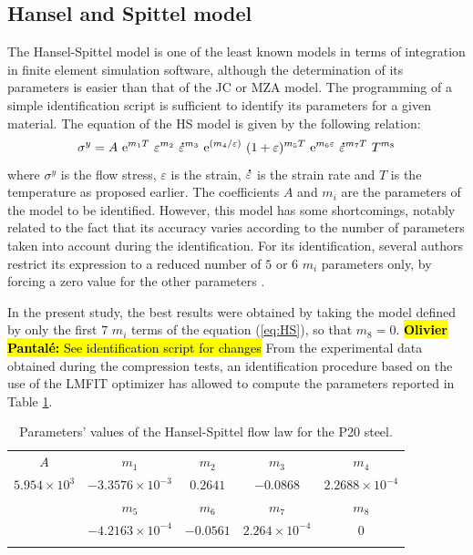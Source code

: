 \documentclass[twoside,english,1p,final,sort&compress]{elsarticle}
\theoremstyle{plain}
\newcommand{\e}[1]{{\rm e}^{#1}}
\newcommand{\mdot}[1]{\accentset{\mbox{\bfseries .}}{#1}}
\DeclareRobustCommand{\OP}[1]{ {\begingroup\sethlcolor{VWyellow}\textcolor{red}{\hl{\textbf{Olivier Pantal\'e:} #1}}\endgroup} }
\begin{document}
\subsection{Hansel and Spittel model\label{sec:HSmodel}}

The Hansel-Spittel model \cite{Hensel-1978} is one of the least known models in terms of integration in finite element simulation software, although the determination of its parameters is easier than that of the JC or MZA model.
The programming of a simple identification script is sufficient to identify its parameters for a given material.
The equation of the HS model is given by the following relation:
\begin{equation}
\sigma^y = A~\e{m_1T}~\varepsilon^{m_2}~\mdot\varepsilon^{m_3}~\e{({m_4}/{\varepsilon})}~(1+\varepsilon)^{m_5T}~\e{m_6\varepsilon}~\mdot\varepsilon^{m_7T}~T^{m_8} \label{eq:HS}
\end{equation}
where $\sigma^y$ is the flow stress, $\varepsilon$ is the strain, $\mdot\varepsilon$ is the strain rate and $T$ is the temperature as proposed earlier.
The coefficients $A$ and $m_i$ are the parameters of the model to be identified.
However, this model has some shortcomings, notably related to the fact that its accuracy varies according to the number of parameters taken into account during the identification.
For its identification, several authors restrict its expression to a reduced number of $5$ or $6$ $m_i$ parameters only, by forcing a zero value for the other parameters \cite{Chadha-2018, Rudnytskyj-2020, Mehtedi-2015}.

In the present study, the best results were obtained by taking the model defined by only the first $7$ $m_i$ terms of the equation (\ref{eq:HS}), so that $m_8=0$.\OP{See identification script for changes}
From the experimental data obtained during the compression tests, an identification procedure based on the use of the LMFIT optimizer \cite{Newville-2016} has allowed to compute the parameters reported in Table \ref{tab:HSparameters}.

\begin{table}[h!]
\centering
\caption{Parameters' values of the Hansel-Spittel flow law for the P20 steel.}
\begin{tabular}{ccccc}
\hline
$A$ & $m_1$ & $m_2$ & $m_3$ & $m_4$\\
$5.954\times 10^{3}$ & $-3.3576\times10^{-3}$ & $0.2641$ & $-0.0868$ & $2.2688\times10^{-4}$\\\hline
& $m_5$ & $m_6$ & $m_7$ & $m_8$\\
& $-4.2163\times10^{-4}$ & $-0.0561$ & $2.264\times10^{-4}$ & $0$\\\hline
\label{tab:HSparameters}
\end{tabular}
\end{table}
\end{document}
